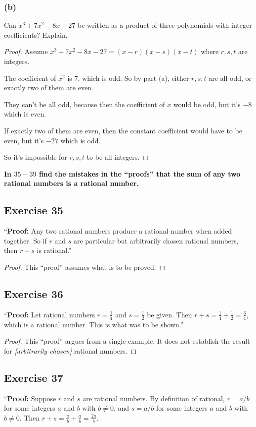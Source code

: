 \documentclass[14pt]{extarticle}
\newcommand{\dps}{\displaystyle}
\newcommand{\cy}{\color{cyan}}
\begin{document}
\subsubsection{(b)}
Can $x^3 + 7x^2 - 8x - 27$ be written as a product of three polynomials with integer coefficients? Explain.

\begin{proof}
    Assume $x^3 + 7x^2 - 8x - 27 = (x-r)(x-s)(x-t)$ where $r,s,t$ are integers.

    The coefficient of $x^2$ is 7, which is odd. So by part (a), either $r,s,t$ are all odd, or exactly two of them are even.

    They can't be all odd, because then the coefficient of $x$ would be odd, but it's $-8$ which is even.

    If exactly two of them are even, then the constant coefficient would have to be even, but it's $-27$ which is odd.

    So it's impossible for $r,s,t$ to be all integers.
\end{proof}

{\bf \cy In $35-39$ find the mistakes in the “proofs” that the sum of any two rational numbers is a rational number.}

\subsection{Exercise 35}
“{\bf Proof:} Any two rational numbers produce a rational number when added together. So if $r$ and $s$ are particular but arbitrarily chosen rational numbers, then $r + s$ is rational.”

\begin{proof}
    This “proof” assumes what is to be proved.
\end{proof}

\subsection{Exercise 36}
“{\bf Proof:} Let rational numbers $r = \frac{1}{4}$ and $s = \frac{1}{2}$ be given. Then $r + s = \frac{1}{4} + \frac{1}{2} = \frac{3}{4}$, which is a rational number. This is what was to be shown.”

\begin{proof}
    This “proof” argues from a single example. It does not establish the result for {\it[arbitrarily chosen]} rational numbers.
\end{proof}

\subsection{Exercise 37}
“{\bf Proof:} Suppose $r$ and $s$ are rational numbers. By
definition of rational, $r = a/b$ for some integers $a$ and $b$ with $b \neq 0$, and $s = a/b$ for some integers $a$ and $b$ with $b \neq 0$. Then $r+s = \dps\frac{a}{b} + \frac{a}{b} = \frac{2a}{b}$.
\end{document}
